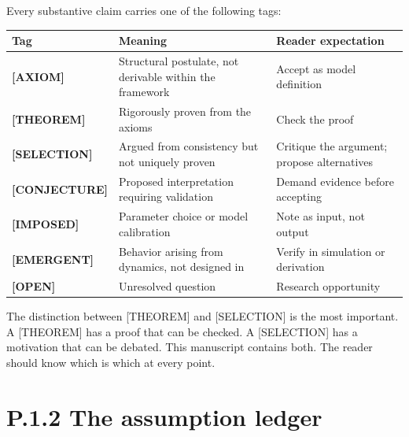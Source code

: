 \documentclass[
  11pt,
  letterpaper,
  twoside,
  openright]{book}
\begin{document}
Every substantive claim carries one of the following tags:

\begin{longtable}[]{@{}
  >{\raggedright\arraybackslash}p{}
  >{\raggedright\arraybackslash}p{}
  >{\raggedright\arraybackslash}p{}@{}}
\toprule\noalign{}
\begin{minipage}[b]{\linewidth}\raggedright
Tag
\end{minipage} & \begin{minipage}[b]{\linewidth}\raggedright
Meaning
\end{minipage} & \begin{minipage}[b]{\linewidth}\raggedright
Reader expectation
\end{minipage} \\
\midrule\noalign{}
\endhead
\bottomrule\noalign{}
\endlastfoot
\textbf{{[}AXIOM{]}} & Structural postulate, not derivable within the
framework & Accept as model definition \\
\textbf{{[}THEOREM{]}} & Rigorously proven from the axioms & Check the
proof \\
\textbf{{[}SELECTION{]}} & Argued from consistency but not uniquely
proven & Critique the argument; propose alternatives \\
\textbf{{[}CONJECTURE{]}} & Proposed interpretation requiring validation
& Demand evidence before accepting \\
\textbf{{[}IMPOSED{]}} & Parameter choice or model calibration & Note as
input, not output \\
\textbf{{[}EMERGENT{]}} & Behavior arising from dynamics, not designed
in & Verify in simulation or derivation \\
\textbf{{[}OPEN{]}} & Unresolved question & Research opportunity \\
\end{longtable}

The distinction between {[}THEOREM{]} and {[}SELECTION{]} is the most
important. A {[}THEOREM{]} has a proof that can be checked. A
{[}SELECTION{]} has a motivation that can be debated. This manuscript
contains both. The reader should know which is which at every point.

\section{P.1.2 The assumption ledger}\label{p.1.2-the-assumption-ledger}
\end{document}

